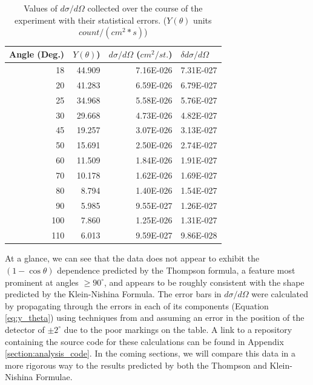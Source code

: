 \documentclass[%
 reprint,
 amsmath,amssymb,
 aps,
 pra,
]{revtex4-1}
\begin{document}
\begin{table}[htbp]
\begin{center}
\begin{tabular}{|r|r|r|r|}
\hline
\multicolumn{1}{|l|}{Angle (Deg.)} & \multicolumn{1}{l|}{$Y(\theta)$)} & \multicolumn{1}{l|}{$d\sigma / d\Omega$ ($cm^2/st.$)} & \multicolumn{1}{l|}{$\delta d\sigma / d\Omega$} \\ \hline
18 & 44.909 & 7.16E-026 & 7.31E-027 \\ \hline
20 & 41.283 & 6.59E-026 & 6.79E-027 \\ \hline
25 & 34.968 & 5.58E-026 & 5.76E-027 \\ \hline
30 & 29.668 & 4.73E-026 & 4.82E-027 \\ \hline
45 & 19.257 & 3.07E-026 & 3.13E-027 \\ \hline
50 & 15.691 & 2.50E-026 & 2.74E-027 \\ \hline
60 & 11.509 & 1.84E-026 & 1.91E-027 \\ \hline
70 & 10.178 & 1.62E-026 & 1.69E-027 \\ \hline
80 & 8.794 & 1.40E-026 & 1.54E-027 \\ \hline
90 & 5.985 & 9.55E-027 & 1.26E-027 \\ \hline
100 & 7.860 & 1.25E-026 & 1.31E-027 \\ \hline
110 & 6.013 & 9.59E-027 & 9.86E-028 \\ \hline
\end{tabular}
\end{center}
\caption{Values of $d\sigma / d\Omega$ collected over the course of the experiment with their statistical errors.  ($Y(\theta)$ units $count/(cm^2*s)$)}
\label{table:dsigma}
\end{table}



\noindent At a glance, we can see that the data does not appear to exhibit the $(1 - \cos{\theta})$ dependence predicted by the Thompson formula, a feature most prominent at angles $\ge 90^\circ$, and appears to be roughly consistent with the shape predicted by the Klein-Nishina Formula. The error bars in $d \sigma / d\Omega$ were calculated by propagating through the errors in each of its components (Equation \ref{eq:y_theta}) using techniques from \cite{bevington} and assuming an error in the position of the detector of $\pm 2^\circ$ due to the poor markings on the table. A link to a repository containing the source code for these calculations can be found in Appendix \ref{section:analysis_code}. In the coming sections, we will compare this data in a more rigorous way to the results predicted by both the Thompson and Klein-Nishina Formulae.
\end{document}
